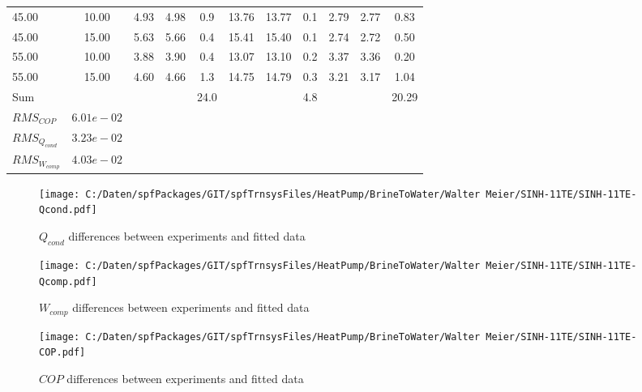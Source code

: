 \documentclass[english]{SPFShortReport}
\begin{document}
\begin{table}[!ht]
\begin{small}
\begin{center}
{\begin{tabular}{l | c c c c c c c c c c }
45.00  & 10.00 & 4.93 & 4.98 & 0.9 & 13.76 & 13.77 & 0.1 & 2.79 & 2.77 & 0.83\\ 
45.00  & 15.00 & 5.63 & 5.66 & 0.4 & 15.41 & 15.40 & 0.1 & 2.74 & 2.72 & 0.50\\ 
55.00  & 10.00 & 3.88 & 3.90 & 0.4 & 13.07 & 13.10 & 0.2 & 3.37 & 3.36 & 0.20\\ 
55.00  & 15.00 & 4.60 & 4.66 & 1.3 & 14.75 & 14.79 & 0.3 & 3.21 & 3.17 & 1.04\\ 
\hline 
 Sum &  & &  & 24.0 &  &  & 4.8 & &  & 20.29\\ 
\hline 
 $RMS_{COP}$ & $6.01e-02$ \\ 
 $RMS_{Q_{cond}}$ & $3.23e-02$ \\ 
 $RMS_{W_{comp}}$ & $4.03e-02$ \\ 
\hline
\hline
\end{tabular}
}
\label{ErrorsTable}
\end{center}
\end{small}
\end{table}
\begin{figure}[!ht]
\begin{center}
\texttt{[image: C:/Daten/spfPackages/GIT/spfTrnsysFiles/HeatPump/BrineToWater/Walter Meier/SINH-11TE/SINH-11TE-Qcond.pdf]}
\caption{$Q_{cond}$ differences between experiments and fitted data}
\label{QcongFig}
\end{center}
\end{figure}
\begin{figure}[!ht]
\begin{center}
\texttt{[image: C:/Daten/spfPackages/GIT/spfTrnsysFiles/HeatPump/BrineToWater/Walter Meier/SINH-11TE/SINH-11TE-Qcomp.pdf]}
\caption{$W_{comp}$ differences between experiments and fitted data}
\label{QcompFig}
\end{center}
\end{figure}
\begin{figure}[!ht]
\begin{center}
\texttt{[image: C:/Daten/spfPackages/GIT/spfTrnsysFiles/HeatPump/BrineToWater/Walter Meier/SINH-11TE/SINH-11TE-COP.pdf]}
\caption{$COP$ differences between experiments and fitted data}
\label{COPFig}
\end{center}
\end{figure}
\end{document}
